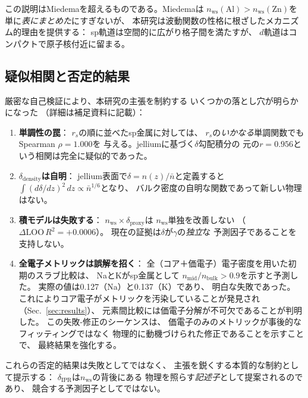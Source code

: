 \documentclass[twocolumn,showpacs,preprintnumbers,amsmath,amssymb,prb]{revtex4-2}
\begin{document}
この説明はMiedemaを超えるものである。Miedemaは
$n_\mathrm{ws}(\mathrm{Al}) > n_\mathrm{ws}(\mathrm{Zn})$を
単に\emph{表にまとめた}にすぎないが、
本研究は波動関数の性格に根ざしたメカニズム的理由を提供する：
sp軌道は空間的に広がり格子間を満たすが、
$d$軌道はコンパクトで原子核付近に留まる。


\subsection{疑似相関と否定的結果}

厳密な自己検証により、本研究の主張を制約する
いくつかの落とし穴が明らかになった
（詳細は補足資料に記載）：

\begin{enumerate}
  \item \textbf{単調性の罠}：
    $r_s$の順に並べたsp金属に対しては、
    $r_s$の\emph{いかなる}単調関数でもSpearman $\rho = 1.000$を
    与える。jelliumに基づく$\delta$勾配積分の
    元の$r = 0.956$という相関は完全に疑似的であった。

  \item \textbf{$\delta_\mathrm{density}$は自明}：
    jellium表面で$\delta = n(z)/\bar{n}$と定義すると
    $\int(d\delta/dz)^2\,dz \propto \bar{n}^{1/6}$となり、
    バルク密度の自明な関数であって新しい物理はない。

  \item \textbf{積モデルは失敗する}：
    $n_\mathrm{ws} \times \delta_\mathrm{proxy}$は
    $n_\mathrm{ws}$単独を改善しない
    （$\Delta\mathrm{LOO}\,R^2 = +0.0006$）。
    現在の証拠は$\delta$が$\gamma$の\emph{独立}な
    予測因子であることを支持しない。

  \item \textbf{全電子メトリックは誤解を招く}：
    全（コア＋価電子）電子密度を用いた初期のスラブ比較は、
    NaとKがsp金属として
    $n_\mathrm{mid}/n_\mathrm{bulk} > 0.9$を示すと予測した。
    実際の値は0.127（Na）と0.137（K）であり、
    明白な失敗であった。
    これによりコア電子がメトリックを汚染していることが発見され
    （Sec.~\ref{sec:results}）、
    元素間比較には価電子分解が不可欠であることが判明した。
    この失敗-修正のシーケンスは、
    価電子のみのメトリックが事後的なフィッティングではなく
    物理的に動機づけられた修正であることを示すことで、
    最終結果を強化する。
\end{enumerate}

これらの否定的結果は失敗としてではなく、
主張を鋭くする本質的な制約として提示する：
$\delta_\mathrm{IPR}$は$n_\mathrm{ws}$の背後にある
物理を照らす\emph{記述子}として提案されるのであり、
競合する予測因子としてではない。
\end{document}
